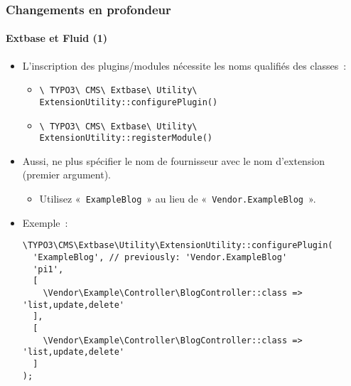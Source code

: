 
\begin{frame}[fragile]
	\frametitle{Changements en profondeur}
	\framesubtitle{Extbase et Fluid (1)}

	\lstset{basicstyle=\tiny\ttfamily}

	\begin{itemize}
		\item L'inscription des plugins/modules nécessite les noms qualifiés des classes~:

			\begin{itemize}\smaller
				\item \texttt{\textbackslash
					TYPO3\textbackslash
					CMS\textbackslash
					Extbase\textbackslash
					Utility\textbackslash
					ExtensionUtility::configurePlugin()}
				\item \texttt{\textbackslash
					TYPO3\textbackslash
					CMS\textbackslash
					Extbase\textbackslash
					Utility\textbackslash
					ExtensionUtility::registerModule()}
			\end{itemize}\normalsize

		\item Aussi, ne plus spécifier le nom de fournisseur avec le nom d'extension (premier argument).

			\begin{itemize}\smaller
				\item[\ding{228}] Utilisez «~\texttt{ExampleBlog}~» au lieu de «~\texttt{Vendor.ExampleBlog}~».
			\end{itemize}

		\item Exemple~:
\begin{lstlisting}
\TYPO3\CMS\Extbase\Utility\ExtensionUtility::configurePlugin(
  'ExampleBlog', // previously: 'Vendor.ExampleBlog'
  'pi1',
  [
    \Vendor\Example\Controller\BlogController::class => 'list,update,delete'
  ],
  [
    \Vendor\Example\Controller\BlogController::class => 'list,update,delete'
  ]
);
\end{lstlisting}

	\end{itemize}

\end{frame}


